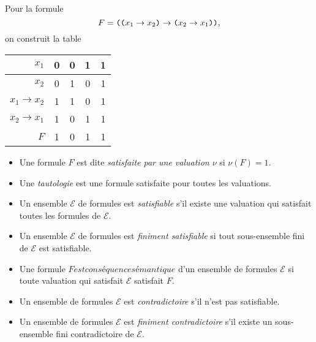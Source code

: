 \documentclass[./main]{subfiles}
\begin{document}
  \begin{exm}
    Pour la formule \[F = \verb|((|x_1\to x_2\verb|)| \to \verb|(|x_2 \to x_1\verb|))|, \] on construit la table 
    \begin{table}[H]
      \centering
      \begin{tabular}{r|cccc}
        $x_1$ & 0 & 0 & 1 & 1\\ \hline
        $x_2$ & 0 & 1 & 0 & 1\\ \hline
        $x_1 \to x_2$ & 1 & 1 & 0 & 1\\ \hline
        $x_2 \to x_1$ & 1 & 0 & 1 & 1\\ \hline
        $F$ & 1 & 0 & 1 & 1
      \end{tabular}
    \end{table}
  \end{exm}

  \begin{defn}
    \begin{itemize}
      \item Une formule $F$ est dite \textit{satisfaite par une valuation $\nu$} si  $\nu(F) = 1$.
      \item Une \textit{tautologie} est une formule satisfaite pour toutes les valuations.
      \item Un ensemble $\mathcal{E}$ de formules est \textit{satisfiable} s'il existe une valuation qui satisfait toutes les formules de $\mathcal{E}$.
      \item Un ensemble $\mathcal{E}$ de formules est \textit{finiment satisfiable} si tout sous-ensemble fini de $\mathcal{E}$ est satisfiable.
      \item Une formule $F est \mathit{conséquence sémantique}$ d'un ensemble de formules $\mathcal{E}$ si toute valuation qui satisfait $\mathcal{E}$ satisfait $F$.
      \item Un ensemble de formules $\mathcal{E}$ est \textit{contradictoire} s'il n'est pas satisfiable.
      \item Un ensemble de formules $\mathcal{E}$ est \textit{finiment contradictoire} s'il existe un sous-ensemble fini contradictoire de $\mathcal{E}$.
    \end{itemize}
  \end{defn}
\end{document}
